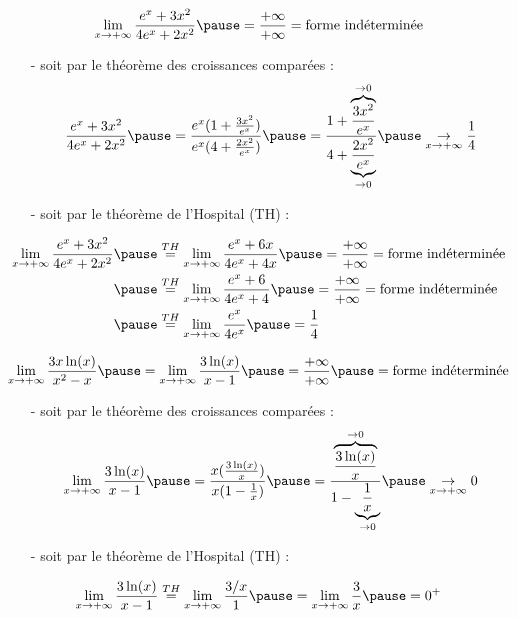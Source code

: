 \documentclass[9pt,handout,professionalfonts,hyperref]{beamer}
\begin{document}
\begin{frame}
$$\lim_{x \to +\infty} \dfrac{e^x+3x^2}{4e^x+2x^2}\pause =\dfrac{+\infty}{+\infty}= \text{forme indéterminée}$$
\pause
\medskip
\begin{itemize}
	\item[-] soit par le théorème des croissances comparées : $$\dfrac{e^x+3x^2}{4e^x+2x^2} \pause= \dfrac{e^x(1+\frac{3x^2}{e^x})}{e^x(4+\frac{2x^2}{e^x})} \pause= \dfrac{1+\overbrace{\frac{3x^2}{e^x}}^{\to 0}}{4+\underbrace{\frac{2x^2}{e^x}}_{\to 0}} \pause \underset{x \to +\infty}{\to} \frac{1}{4} $$ \newline 
	
 \pause	\item[-] soit par le théorème de l'Hospital (TH) :  
\end{itemize}

\[\begin{aligned}
\lim_{x \to +\infty} \dfrac{e^x+3x^2}{4e^x+2x^2}
\pause &\overset{TH}{=}\lim_{x \to +\infty} \dfrac{e^x+6x}{4e^x+4x}\pause =\dfrac{+\infty}{+\infty}= \text{forme indéterminée}\\
\pause &\overset{TH}{=}\lim_{x \to +\infty} \dfrac{e^x+6}{4e^x+4}\pause =\dfrac{+\infty}{+\infty}= \text{forme indéterminée}\\
\pause &\overset{TH}{=}\lim_{x \to +\infty} \dfrac{e^x}{4e^x} \pause = \dfrac{1}{4}
\end{aligned}\]
\end{frame}

\begin{frame}
\[\begin{aligned}
\lim_{x \to +\infty} \dfrac{3 x \ln(x)}{x^2-x}\pause =\lim_{x \to +\infty} \dfrac{3 \ln(x)}{x-1}\pause =\dfrac{+\infty}{+\infty} \pause = \text{forme indéterminée}
\end{aligned}\]

\pause
\medskip
\begin{itemize}
	\item[-] soit par le théorème des croissances comparées : $$\lim_{x \to +\infty} \dfrac{3 \ln(x)}{x-1} \pause= \dfrac{x(\frac{3 \ln(x)}{x})}{x(1-\frac{1}{x})} \pause= \dfrac{\overbrace{\frac{3\ln(x)}{x}}^{\to 0}}{1-\underbrace{\frac{1}{x}}_{\to 0}} \pause \underset{x \to +\infty}{\to} 0 $$ \newline 
	
	\pause	\item[-] soit par le théorème de l'Hospital (TH) :  
\end{itemize}

\[\begin{aligned}
\lim_{x \to +\infty} \dfrac{3 \ln(x)}{x-1} \overset{TH}{=} \lim_{x \to +\infty} \dfrac{3/x}{1}\pause =\lim_{x \to +\infty} \dfrac{3}{x}\pause  = 0^+
\end{aligned}\]

\end{frame}
\end{document}
